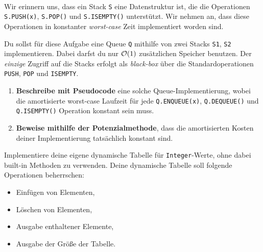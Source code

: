\documentclass{uebung_cs}
\begin{document}
\begin{exercise}\mbox{}\\
    Wir erinnern uns, dass ein Stack \texttt{S} eine Datenstruktur ist, die die Operationen \texttt{S.PUSH(x)}, \texttt{S.POP()} und \texttt{S.ISEMPTY()} unterstützt. Wir nehmen an, dass diese Operationen in konstanter \emph{worst-case} Zeit implementiert worden sind.

    Du sollst für diese Aufgabe eine Queue \texttt{Q} mithilfe von zwei Stacks \texttt{S1}, \texttt{S2} implementieren. Dabei darfst du nur $\mathcal{O}(1)$ zusätzlichen Speicher benutzen.
    Der \textit{einzige} Zugriff auf die Stacks erfolgt als \emph{black-box} über die Standardoperationen \texttt{PUSH}, \texttt{POP} und \texttt{ISEMPTY}.
    \begin{enumerate}
        \item{}\mittel
              \textbf{Beschreibe mit Pseudocode} eine solche Queue-Implementierung, wobei die amortisierte worst-case Laufzeit für jede \texttt{Q.ENQUEUE(x)}, \texttt{Q.DEQUEUE()} und \texttt{Q.ISEMPTY()} Operation konstant sein muss.
        \item{}\note
              \textbf{Beweise mithilfe der Potenzialmethode}, dass die amortisierten Kosten deiner Implementierung tatsächlich konstant sind.
    \end{enumerate}
\end{exercise}

\begin{exercise}
    Implementiere deine eigene dynamische Tabelle für \texttt{Integer}-Werte, ohne dabei built-in Methoden zu verwenden. Deine dynamische Tabelle soll folgende Operationen beherrschen:
    \begin{itemize}
        \item Einfügen von Elementen,
        \item Löschen von Elementen,
        \item Ausgabe enthaltener Elemente,
        \item Ausgabe der Größe der Tabelle.
    \end{itemize}
\end{exercise}
\end{document}
